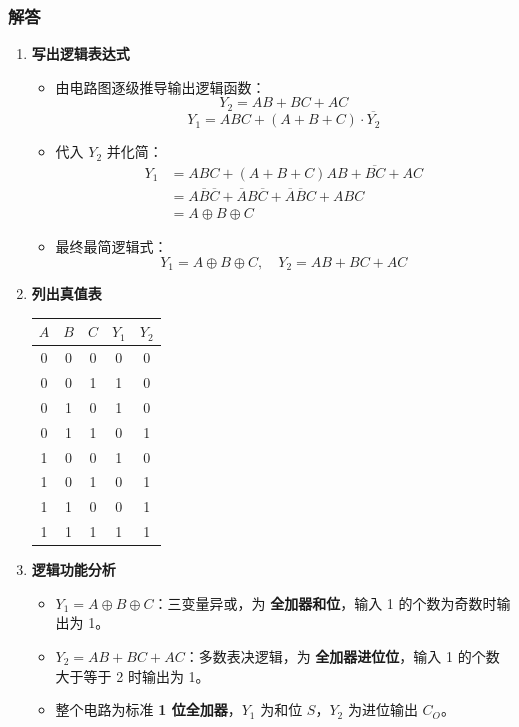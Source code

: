 \subsubsection{解答}
\begin{enumerate}
    \item \textbf{写出逻辑表达式}
    \begin{itemize}
        \item 由电路图逐级推导输出逻辑函数：
        \[
        Y_2 = AB + BC + AC
        \]
        \[
        Y_1 = ABC + (A+B+C) \cdot \overline{Y_2}
        \]
        \item 代入 $Y_2$ 并化简：
        \[
        \begin{aligned}
        Y_1 &= ABC + (A+B+C)\overline{AB+BC+AC} \\
        &= A\overline{B}\overline{C} + \overline{A}B\overline{C} + \overline{A}\overline{B}C + ABC \\
        &= A \oplus B \oplus C
        \end{aligned}
        \]
        \item 最终最简逻辑式：
        \[
        \boxed{Y_1 = A \oplus B \oplus C,\quad Y_2 = AB + BC + AC}
        \]
    \end{itemize}

    \item \textbf{列出真值表}
    \begin{center}
    \begin{tabular}{ccc|cc}
        \toprule
        $A$ & $B$ & $C$ & $Y_1$ & $Y_2$ \\
        \midrule
        0 & 0 & 0 & 0 & 0 \\
        0 & 0 & 1 & 1 & 0 \\
        0 & 1 & 0 & 1 & 0 \\
        0 & 1 & 1 & 0 & 1 \\
        1 & 0 & 0 & 1 & 0 \\
        1 & 0 & 1 & 0 & 1 \\
        1 & 1 & 0 & 0 & 1 \\
        1 & 1 & 1 & 1 & 1 \\
        \bottomrule
    \end{tabular}
    \end{center}

    \item \textbf{逻辑功能分析}
    \begin{itemize}
        \item $Y_1 = A \oplus B \oplus C$：三变量异或，为 \textbf{全加器和位}，输入 1 的个数为奇数时输出为 1。
        \item $Y_2 = AB+BC+AC$：多数表决逻辑，为 \textbf{全加器进位位}，输入 1 的个数大于等于 2 时输出为 1。
        \item 整个电路为标准 \textbf{1 位全加器}，$Y_1$ 为和位 $S$，$Y_2$ 为进位输出 $C_O$。
    \end{itemize}
\end{enumerate}

